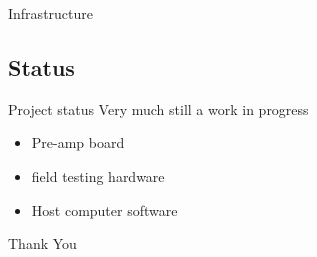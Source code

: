 \documentclass{beamer}
\begin{document}
\begin{frame}{Infrastructure}
  \begin{figure}[!hpbt]
    \centering 
    
  \end{figure}
\end{frame}

\subsection{Status}

\begin{frame}{Project status}
  Very much still a work in progress
  \begin{itemize}
    \item Pre-amp board
    \item field testing hardware
    \item Host computer software
  \end{itemize}
  Thank You
\end{frame}
\end{document}
